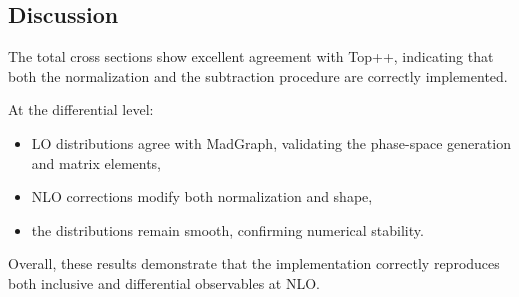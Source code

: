 \subsection{Discussion}

The total cross sections show excellent agreement with Top++,
indicating that both the normalization and the subtraction procedure
are correctly implemented.

At the differential level:
\begin{itemize}
    \item LO distributions agree with MadGraph, validating the phase-space
    generation and matrix elements,
    \item NLO corrections modify both normalization and shape,
    \item the distributions remain smooth, confirming numerical stability.
\end{itemize}

Overall, these results demonstrate that the implementation correctly
reproduces both inclusive and differential observables at NLO.